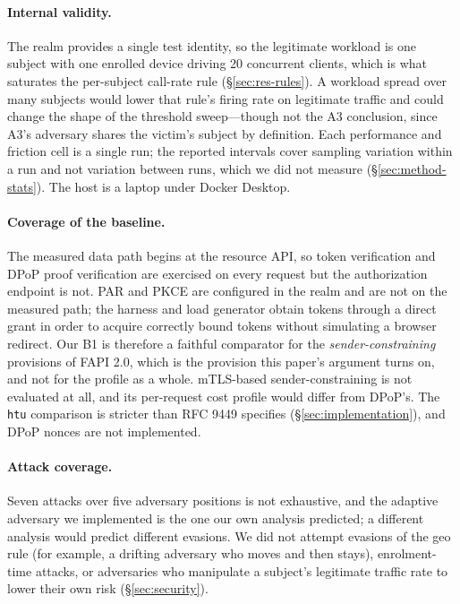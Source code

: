 \paragraph{Internal validity.} The realm provides a single test identity, so the legitimate workload is one subject with one enrolled device driving 20 concurrent clients, which is what saturates the per-subject call-rate rule (\S\ref{sec:res-rules}). A workload spread over many subjects would lower that rule's firing rate on legitimate traffic and could change the shape of the threshold sweep---though not the A3 conclusion, since A3's adversary shares the victim's subject by definition. Each performance and friction cell is a single run; the reported intervals cover sampling variation within a run and not variation between runs, which we did not measure (\S\ref{sec:method-stats}). The host is a laptop under Docker Desktop.

\paragraph{Coverage of the baseline.} The measured data path begins at the resource API, so token verification and DPoP proof verification are exercised on every request but the authorization endpoint is not. PAR and PKCE are configured in the realm and are not on the measured path; the harness and load generator obtain tokens through a direct grant in order to acquire correctly bound tokens without simulating a browser redirect. Our B1 is therefore a faithful comparator for the \textit{sender-constraining} provisions of FAPI 2.0, which is the provision this paper's argument turns on, and not for the profile as a whole. mTLS-based sender-constraining is not evaluated at all, and its per-request cost profile would differ from DPoP's. The \texttt{htu} comparison is stricter than RFC 9449 specifies (\S\ref{sec:implementation}), and DPoP nonces are not implemented.

\paragraph{Attack coverage.} Seven attacks over five adversary positions is not exhaustive, and the adaptive adversary we implemented is the one our own analysis predicted; a different analysis would predict different evasions. We did not attempt evasions of the geo rule (for example, a drifting adversary who moves and then stays), enrolment-time attacks, or adversaries who manipulate a subject's legitimate traffic rate to lower their own risk (\S\ref{sec:security}).

